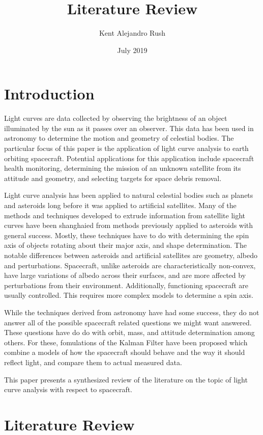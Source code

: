 \documentclass{article}
\title{Literature Review}
\author{Kent Alejandro Rush }
\date{July 2019}
\begin{document}
\maketitle

\section{Introduction}

Light curves are data collected by observing the brightness of an object illuminated by the sun as it passes over an observer. This data has been used in astronomy to determine the motion and geometry of celestial bodies. The particular focus of this paper is the application of light curve analysis to earth orbiting spacecraft. Potential applications for this application include spacecraft health monitoring, determining the mission of an unknown satellite from its attitude and geometry, and selecting targets for space debris removal.

Light curve analysis has been applied to natural celestial bodies such as planets and asteroids long before it was applied to artificial satellites. Many of the methods and techniques developed to extrude information from satellite light curves have been shanghaied from methods previously applied to asteroids with general success. Mostly, these techniques have to do with determining the spin axis of objects rotating about their major axis, and shape determination. The notable differences between asteroids and artificial satellites are geometry, albedo and perturbations. Spacecraft, unlike asteroids are characteristically non-convex, have large variations of albedo across their surfaces, and are more affected by perturbations from their environment. Additionally, functioning spacecraft are usually controlled. This requires more complex models to determine a spin axis.

While the techniques derived from astronomy have had some success, they do not answer all of the possible spacecraft related questions we might want answered. These questions have do do with orbit, mass, and attitude determination among others. For these, fomulations of the Kalman Filter have been proposed which combine a models of how the spacecraft should behave and the way it should reflect light, and compare them to actual measured data. 

This paper presents a synthesized review of the literature on the topic of light curve analysis with respect to spacecraft.

\section{Literature Review}
\end{document}
